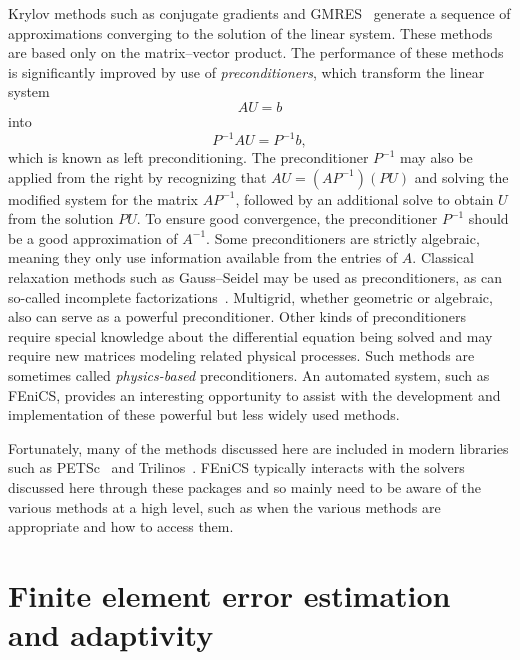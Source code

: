 %
Krylov methods such as conjugate gradients and
GMRES~\citep{SaadSchultz1986} generate a sequence of approximations
converging to the solution of the linear system. These methods are
based only on the matrix--vector product.  The performance of these
methods is significantly improved by use of \emph{preconditioners},
which transform the linear system
\begin{equation}
AU = b
\end{equation}
into
\begin{equation}
P^{-1} A U = P^{-1} b,
\end{equation}
which is known as left preconditioning. The preconditioner $P^{-1}$
may also be applied from the right by recognizing that $A U = (A
P^{-1}) (P U)$ and solving the modified system for the matrix $A
P^{-1}$, followed by an additional solve to obtain $U$ from the
solution $PU$. To ensure good convergence, the preconditioner $P^{-1}$
should be a good approximation of $A^{-1}$. Some preconditioners are
strictly algebraic, meaning they only use information available from
the entries of \( A \). Classical relaxation methods such as
Gauss--Seidel may be used as preconditioners, as can so-called
incomplete
factorizations~\citep{Manteuffel1980,Axelsson1986,Saad1994}. Multigrid,
whether geometric or algebraic, also can serve as a powerful
preconditioner. Other kinds of preconditioners require special
knowledge about the differential equation being solved and may require
new matrices modeling related physical processes.  Such methods are
sometimes called \emph{physics-based} preconditioners. An automated
system, such as FEniCS, provides an interesting opportunity to assist
with the development and implementation of these powerful but less
widely used methods.

Fortunately, many of the methods discussed here are included in modern
libraries such as PETSc~\citep{BalayBuschelmanEijkhoutEtAl2004} and
Trilinos~\citep{HerouxBartlettHowleEtAl2005}. FEniCS typically
interacts with the solvers discussed here through these packages and
so mainly need to be aware of the various methods at a high level,
such as when the various methods are appropriate and how to access
them.

\section{Finite element error estimation and adaptivity}

